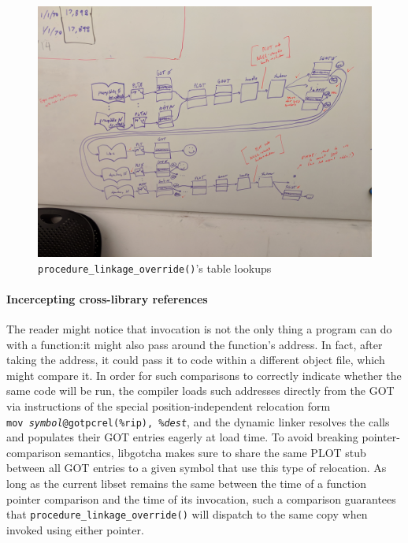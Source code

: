 \begin{figure}
\includegraphics[width=\columnwidth]{figs/tables}
\caption{\texttt{procedure\_linkage\_override()}'s table lookups}
\label{fig:override}
\end{figure}

\paragraph{Incercepting cross-library references}

The reader might notice that invocation is not the only thing a program can do with a
function:\@ it might also pass around the function's address.  In fact, after taking
the address, it could pass it to code within a different object file, which might
compare it.  In order for such comparisons to correctly indicate whether the same
code will be run, the compiler loads such addresses directly from the GOT via
instructions of the special position-independent relocation form
\texttt{mov~\textit{symbol}@gotpcrel(\%rip),~\%\textit{dest}}, and the dynamic linker
resolves the calls and populates their GOT entries eagerly at load time.  To avoid
breaking pointer-comparison semantics, libgotcha makes sure to share the same PLOT
stub between all GOT entries to a given symbol that use this type of
relocation.  As long as the current libset remains the same between the time of a
function pointer comparison and the time of its invocation, such a comparison
guarantees that \texttt{procedure\_linkage\_override()} will dispatch to the same
copy when invoked using either pointer.

